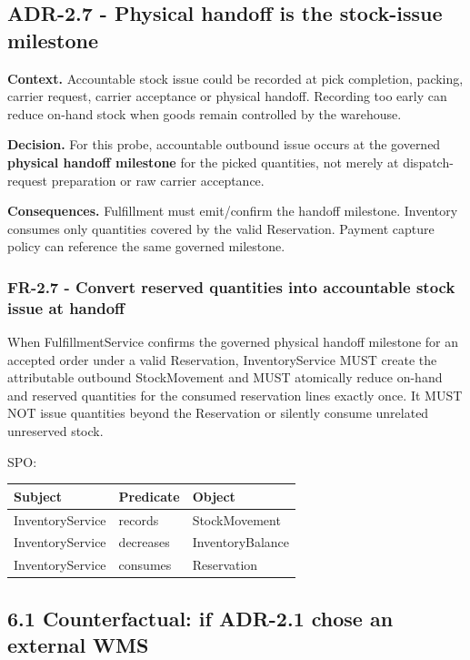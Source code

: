 \documentclass[
  10pt,
]{article}
\begin{document}
\subsection{ADR-2.7 - Physical handoff is the stock-issue
milestone}\label{adr-27---physical-handoff-is-the-stock-issue-milestone}

\textbf{Context.} Accountable stock issue could be recorded at pick
completion, packing, carrier request, carrier acceptance or physical
handoff. Recording too early can reduce on-hand stock when goods remain
controlled by the warehouse.

\textbf{Decision.} For this probe, accountable outbound issue occurs at
the governed \textbf{physical handoff milestone} for the picked
quantities, not merely at dispatch-request preparation or raw carrier
acceptance.

\textbf{Consequences.} Fulfillment must emit/confirm the handoff
milestone. Inventory consumes only quantities covered by the valid
Reservation. Payment capture policy can reference the same governed
milestone.

\subsubsection{FR-2.7 - Convert reserved quantities into accountable
stock issue at
handoff}\label{fr-27---convert-reserved-quantities-into-accountable-stock-issue-at-handoff}

When FulfillmentService confirms the governed physical handoff milestone
for an accepted order under a valid Reservation, InventoryService MUST
create the attributable outbound StockMovement and MUST atomically
reduce on-hand and reserved quantities for the consumed reservation
lines exactly once. It MUST NOT issue quantities beyond the Reservation
or silently consume unrelated unreserved stock.

SPO:

\begin{longtable}[]{@{}lll@{}}
\toprule\noalign{}
Subject & Predicate & Object \\
\midrule\noalign{}
\endhead
\bottomrule\noalign{}
\endlastfoot
InventoryService & records & StockMovement \\
InventoryService & decreases & InventoryBalance \\
InventoryService & consumes & Reservation \\
\end{longtable}

\subsection{6.1 Counterfactual: if ADR-2.1 chose an external
WMS}\label{61-counterfactual-if-adr-21-chose-an-external-wms}
\end{document}
